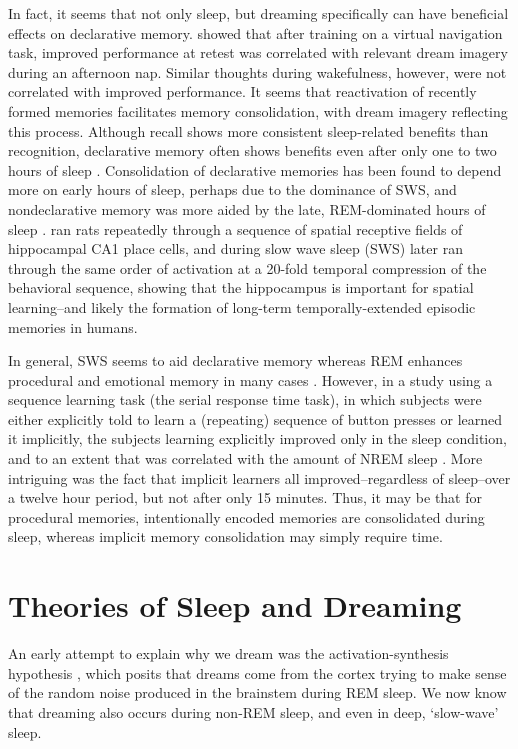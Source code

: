 \documentclass[10pt,letterpaper]{article}
\begin{document}
In fact, it seems that not only sleep, but dreaming specifically can have beneficial effects on declarative memory.  showed that after training on a virtual navigation task, improved performance at retest was correlated with relevant dream imagery during an afternoon nap. Similar thoughts during wakefulness, however, were not correlated with improved performance. It seems that reactivation of recently formed memories facilitates memory consolidation, with dream imagery reflecting this process. Although recall shows more consistent sleep-related benefits than recognition, declarative memory often shows benefits even after only one to two hours of sleep \cite{Diekelmann:2009}. Consolidation of declarative memories has been found to depend more on early hours of sleep, perhaps due to the dominance of SWS, and nondeclarative memory was more aided by the late, REM-dominated hours of sleep \cite{Plihal:1999}.   ran rats repeatedly through a sequence of spatial receptive fields of hippocampal CA1 place cells, and during slow wave sleep (SWS) later ran through the same order of activation at a 20-fold temporal compression of the behavioral sequence, showing that the hippocampus is important for spatial learning--and likely the formation of long-term temporally-extended episodic memories in humans.

In general, SWS seems to aid declarative memory whereas REM enhances procedural and emotional memory in many cases \cite{Mednick:2010}. However, in a study using a sequence learning task (the serial response time task), in which subjects were either explicitly told to learn a (repeating) sequence of button presses or learned it implicitly, the subjects learning explicitly improved only in the sleep condition, and to an extent that was correlated with the amount of NREM sleep \cite{Robertson:2004}. More intriguing was the fact that implicit learners all improved--regardless of sleep--over a twelve hour period, but not after only 15 minutes. Thus, it may be that for procedural memories, intentionally encoded memories are consolidated during sleep, whereas implicit memory consolidation may simply require time.
\vspace{-.1cm}
\section{Theories of Sleep and Dreaming}
\vspace{-.1cm}
An early attempt to explain why we dream was the activation-synthesis hypothesis \cite{Hobson:1977}, which posits that dreams come from the cortex trying to make sense of the random noise produced in the brainstem during REM sleep. We now know that dreaming also occurs during non-REM sleep, and even in deep, `slow-wave' sleep.
\end{document}
